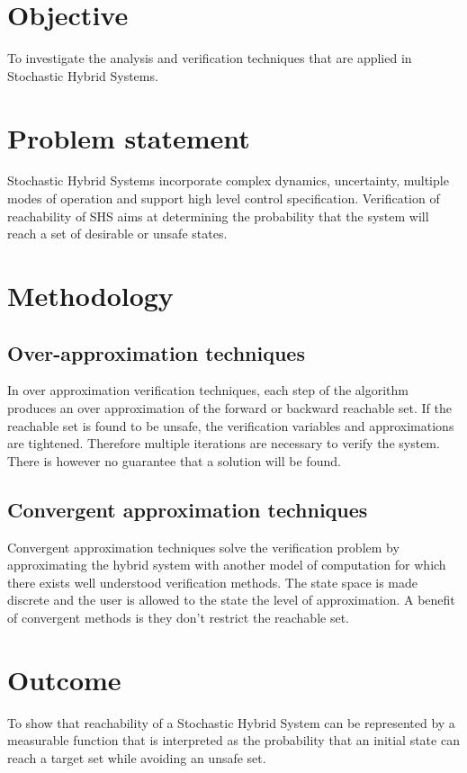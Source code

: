 \documentclass{article}
\begin{document}
\section{Objective}
To investigate the analysis and verification techniques that are applied in Stochastic Hybrid Systems.

\section{Problem statement}
Stochastic Hybrid Systems incorporate complex dynamics, uncertainty, multiple modes of operation and support high level control specification. Verification of reachability of SHS aims at determining the probability that the system will reach a set of desirable or unsafe states.

\section{Methodology}
\subsection{Over-approximation techniques}
In over approximation verification techniques, each step of the algorithm produces an over approximation of the forward or backward reachable set. If the reachable set is found to be unsafe, the verification variables and approximations are tightened. Therefore multiple iterations are necessary to verify the system. There is however no guarantee that a solution will be found.

\subsection{Convergent approximation techniques}
Convergent approximation techniques solve the verification problem by approximating the hybrid system with another model of computation for which there exists well understood verification methods. The state space is made discrete and the user is allowed to the state the level of approximation. A benefit of convergent methods is they don’t restrict the reachable set.

\section{Outcome}
To show that reachability of a Stochastic Hybrid System can be represented by a measurable function that is interpreted as the probability that an initial state can reach a target set while avoiding an unsafe set.
\end{document}
